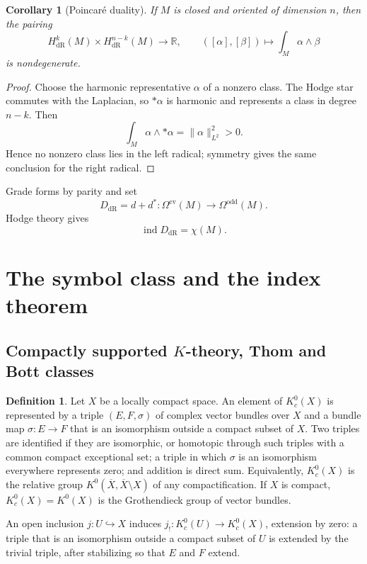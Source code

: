 \documentclass[11pt,oneside,reqno]{book}
\DeclareMathOperator{\ind}{ind}
\theoremstyle{plain}
\newtheorem{corollary}[theorem]{Corollary}
\theoremstyle{definition}
\newtheorem{definition}[theorem]{Definition}
\theoremstyle{remark}
\begin{document}
\begin{corollary}[Poincar\'e duality]
If \(M\) is closed and oriented of dimension \(n\), then the pairing
\[
 H^k_{\mathrm{dR}}(M)\times H^{n-k}_{\mathrm{dR}}(M)
 \longrightarrow\mathbb R,
 \qquad
 ([\alpha],[\beta])\longmapsto\int_M\alpha\wedge\beta
\]
is nondegenerate.
\end{corollary}

\begin{proof}
Choose the harmonic representative \(\alpha\) of a nonzero class.
The Hodge star commutes with the Laplacian, so \(*\alpha\) is harmonic and
represents a class in degree \(n-k\).  Then
\[
 \int_M\alpha\wedge *\alpha=\lVert\alpha\rVert_{L^2}^2>0.
\]
Hence no nonzero class lies in the left radical; symmetry gives the same
conclusion for the right radical.
\end{proof}

Grade forms by parity and set
\[
 D_{\mathrm{dR}}=d+d^*:
 \Omega^{\mathrm{ev}}(M)\longrightarrow\Omega^{\mathrm{odd}}(M).
\]
Hodge theory gives
\[
 \ind D_{\mathrm{dR}}=\chi(M).
\]

\section{The symbol class and the index theorem}

\subsection*{Compactly supported \(K\)-theory, Thom and Bott classes}

\begin{definition}\label{def:Kc}
Let \(X\) be a locally compact space.  An element of \(K_c^0(X)\) is
represented by a triple \((E,F,\sigma)\) of complex vector bundles over
\(X\) and a bundle map \(\sigma:E\to F\) that is an isomorphism outside a
compact subset of \(X\).  Two triples are identified if they are
isomorphic, or homotopic through such triples with a common compact
exceptional set; a triple in which \(\sigma\) is an isomorphism everywhere
represents zero; and addition is direct sum.  Equivalently, \(K_c^0(X)\)
is the relative group \(K^0(\overline X,\overline X\setminus X)\) of any
compactification.  If \(X\) is compact, \(K_c^0(X)=K^0(X)\) is the
Grothendieck group of vector bundles.
\end{definition}

An open inclusion \(j:U\hookrightarrow X\) induces
\(j_!:K_c^0(U)\to K_c^0(X)\), extension by zero: a triple that is an
isomorphism outside a compact subset of \(U\) is extended by the trivial
triple, after stabilizing so that \(E\) and \(F\) extend.
\end{document}
